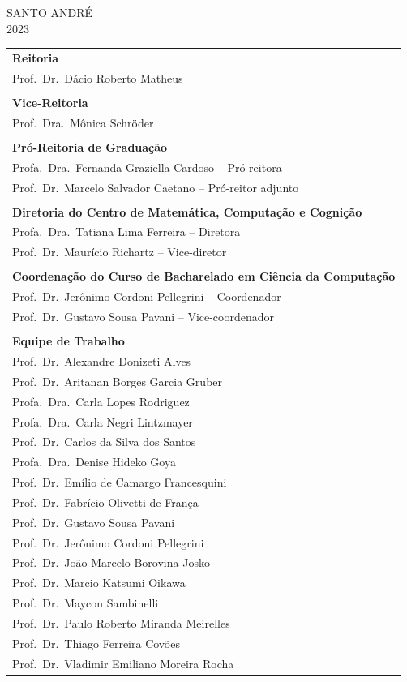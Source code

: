 \documentclass[a4paper]{article}
\begin{document}
\begin{center}
    SANTO ANDRÉ \\ 2023
\end{center}

\newpage

\begin{tabular}{l}
    \textbf{Reitoria}\\
    Prof.\ Dr.\ Dácio Roberto Matheus\\
    \\
    \textbf{Vice-Reitoria}\\
    Prof.\ Dra.\ Mônica Schröder\\
    \\
    \textbf{Pró-Reitoria de Graduação}\\
    Profa.\ Dra.\ Fernanda Graziella Cardoso -- Pró-reitora\\
    Prof.\ Dr.\ Marcelo Salvador Caetano -- Pró-reitor adjunto\\
    \\
    \textbf{Diretoria do Centro de Matemática, Computação e Cognição}\\
    Profa.\ Dra.\ Tatiana Lima Ferreira -- Diretora\\
    Prof.\ Dr.\ Maurício Richartz -- Vice-diretor\\
    \\
    \textbf{Coordenação do Curso de Bacharelado em Ciência da Computação}\\
    Prof.\ Dr.\ Jerônimo Cordoni Pellegrini -- Coordenador\\
    Prof.\ Dr.\ Gustavo Sousa Pavani -- Vice-coordenador\\
    \\
    \textbf{Equipe de Trabalho}\\
    Prof.\ Dr.\ Alexandre Donizeti Alves\\
    Prof.\ Dr.\ Aritanan Borges Garcia Gruber\\
    Profa.\ Dra.\ Carla Lopes Rodriguez\\
    Profa.\ Dra.\ Carla Negri Lintzmayer\\
    Prof.\ Dr.\ Carlos da Silva dos Santos\\
    Profa.\ Dra.\ Denise Hideko Goya\\
    Prof.\ Dr.\ Emílio de Camargo Francesquini\\
    Prof.\ Dr.\ Fabrício Olivetti de França\\
    Prof.\ Dr.\ Gustavo Sousa Pavani\\
    Prof.\ Dr.\ Jerônimo Cordoni Pellegrini\\
    Prof.\ Dr.\ João Marcelo Borovina Josko\\
    Prof.\ Dr.\ Marcio Katsumi Oikawa\\
    Prof.\ Dr.\ Maycon Sambinelli\\
    Prof.\ Dr.\ Paulo Roberto Miranda Meirelles\\
    Prof.\ Dr.\ Thiago Ferreira Covões\\
    Prof.\ Dr.\ Vladimir Emiliano Moreira Rocha\\
\end{tabular}
\end{document}
